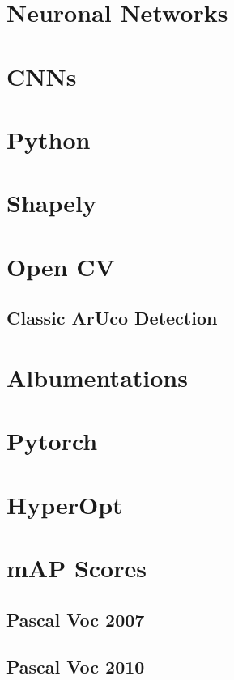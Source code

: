 \documentclass[10pt]{book}
\begin{document}
\section{Neuronal Networks}

\section{CNNs}

\section{Python}

\section{Shapely}

\section{Open CV}

\subsection{Classic ArUco Detection}

\section{Albumentations}

\section{Pytorch}

\section{HyperOpt}

\section{mAP Scores}

\subsection{Pascal Voc 2007}

\subsection{Pascal Voc 2010}
\end{document}
